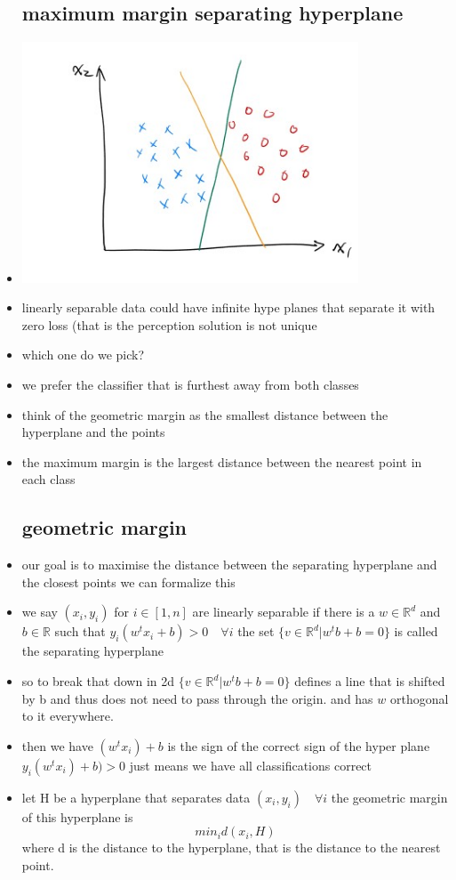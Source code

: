 \documentclass{article}
\begin{document}
\begin{itemize}
\subsection{maximum margin separating hyperplane}
\item \includegraphics[width=10cm]{lecture_notes/lecture_4/immmages/l4_3.jpg}
\item linearly separable data could have infinite hype planes that separate it with zero loss (that is the perception solution is not unique
\item which one do we pick?
\item we prefer the classifier that is furthest away from both classes
\item think of the geometric margin as the smallest distance between the hyperplane and the points 
\item the maximum margin is the largest distance between the nearest point in each class
\subsection{geometric margin}
\item our goal is to maximise the distance between the separating hyperplane and the closest points we can formalize this  
\item we say $(x_i,y_i)$ for $i\in[1,n]$ are linearly separable if there is a $w\in\mathbb{R}^{d}$ and $b\in \mathbb{R}$ such that $y_i(w^{t}x_i+b)>0\quad \forall i$ the set $\{v \in\mathbb{R}^{d}|w^{t}b+b=0\}$ is called the separating hyperplane 
\item so to break that down in 2d $\{v \in\mathbb{R}^{d}|w^{t}b+b=0\}$ defines a line that is shifted by b and thus  does not need to pass through the origin. and has $w$ orthogonal to it everywhere. 
\item then we have $(w^{t}x_i)+b$ is the sign of the correct sign of the hyper plane $y_i(w^{t}x_i)+b)>0$ just means we have all classifications correct
\item let H be a hyperplane that separates data $(x_i,y_i)\quad \forall i$ the geometric margin of this hyperplane is $$min_{i}d(x_i,H)$$ where d is the distance to the hyperplane, that is the distance to the nearest point. 

\end{itemize}
\end{document}
